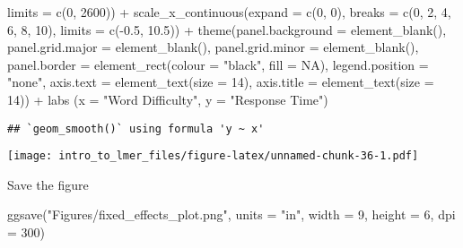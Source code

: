 \documentclass[
]{article}
\newenvironment{Shaded}{\begin{snugshade}}{\end{snugshade}}
\newcommand{\AttributeTok}[1]{\textcolor[rgb]{0.77,0.63,0.00}{#1}}
\newcommand{\ConstantTok}[1]{\textcolor[rgb]{0.00,0.00,0.00}{#1}}
\newcommand{\DecValTok}[1]{\textcolor[rgb]{0.00,0.00,0.81}{#1}}
\newcommand{\FloatTok}[1]{\textcolor[rgb]{0.00,0.00,0.81}{#1}}
\newcommand{\FunctionTok}[1]{\textcolor[rgb]{0.00,0.00,0.00}{#1}}
\newcommand{\NormalTok}[1]{#1}
\newcommand{\SpecialCharTok}[1]{\textcolor[rgb]{0.00,0.00,0.00}{#1}}
\newcommand{\StringTok}[1]{\textcolor[rgb]{0.31,0.60,0.02}{#1}}
\begin{document}
\begin{Shaded}
\begin{Highlighting}[]
                     \AttributeTok{limits =} \FunctionTok{c}\NormalTok{(}\DecValTok{0}\NormalTok{, }\DecValTok{2600}\NormalTok{)) }\SpecialCharTok{+}
  \FunctionTok{scale\_x\_continuous}\NormalTok{(}\AttributeTok{expand =} \FunctionTok{c}\NormalTok{(}\DecValTok{0}\NormalTok{, }\DecValTok{0}\NormalTok{), }\AttributeTok{breaks =} \FunctionTok{c}\NormalTok{(}\DecValTok{0}\NormalTok{, }\DecValTok{2}\NormalTok{, }\DecValTok{4}\NormalTok{, }\DecValTok{6}\NormalTok{, }\DecValTok{8}\NormalTok{, }\DecValTok{10}\NormalTok{), }
                     \AttributeTok{limits =} \FunctionTok{c}\NormalTok{(}\SpecialCharTok{{-}}\FloatTok{0.5}\NormalTok{, }\FloatTok{10.5}\NormalTok{)) }\SpecialCharTok{+}
  \FunctionTok{theme}\NormalTok{(}\AttributeTok{panel.background =} \FunctionTok{element\_blank}\NormalTok{(),         }
        \AttributeTok{panel.grid.major =} \FunctionTok{element\_blank}\NormalTok{(),}
        \AttributeTok{panel.grid.minor =} \FunctionTok{element\_blank}\NormalTok{(),}
        \AttributeTok{panel.border =} \FunctionTok{element\_rect}\NormalTok{(}\AttributeTok{colour =} \StringTok{"black"}\NormalTok{, }\AttributeTok{fill =} \ConstantTok{NA}\NormalTok{),}
        \AttributeTok{legend.position =} \StringTok{"none"}\NormalTok{,}
        \AttributeTok{axis.text =} \FunctionTok{element\_text}\NormalTok{(}\AttributeTok{size =} \DecValTok{14}\NormalTok{),}
        \AttributeTok{axis.title =} \FunctionTok{element\_text}\NormalTok{(}\AttributeTok{size =} \DecValTok{14}\NormalTok{)) }\SpecialCharTok{+}
  \FunctionTok{labs}\NormalTok{ (}\AttributeTok{x =} \StringTok{"Word Difficulty"}\NormalTok{, }\AttributeTok{y =} \StringTok{"Response Time"}\NormalTok{) }
\end{Highlighting}
\end{Shaded}

\begin{verbatim}
## `geom_smooth()` using formula 'y ~ x'
\end{verbatim}

\texttt{[image: intro\_to\_lmer\_files/figure-latex/unnamed-chunk-36-1.pdf]}

Save the figure

\begin{Shaded}
\begin{Highlighting}[]
\FunctionTok{ggsave}\NormalTok{(}\StringTok{"Figures/fixed\_effects\_plot.png"}\NormalTok{, }\AttributeTok{units =} \StringTok{"in"}\NormalTok{, }\AttributeTok{width =} \DecValTok{9}\NormalTok{, }\AttributeTok{height =} \DecValTok{6}\NormalTok{, }\AttributeTok{dpi =} \DecValTok{300}\NormalTok{)}
\end{Highlighting}
\end{Shaded}
\end{document}
